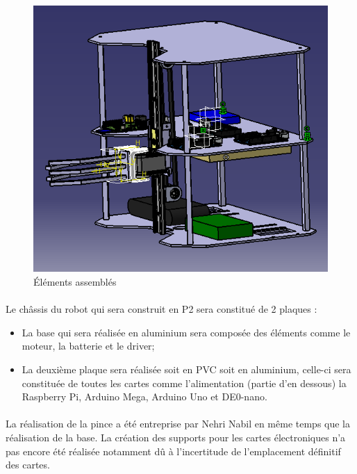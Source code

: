 \vspace{5mm}
\begin{figure}[!ht]
	\centering
		\includegraphics{assemblage.png}
	\caption{Éléments assemblés}
	\label{fig:assemblage}
\end{figure}

\paragraph{}
Le châssis du robot qui sera construit en P2 sera constitué de 2 plaques :
\begin{itemize}
	\item La base qui sera réalisée en aluminium sera composée des éléments comme le moteur, la batterie et le driver; 
	\item La deuxième plaque sera réalisée soit en PVC soit en aluminium, celle-ci sera constituée de toutes les cartes comme l'alimentation (partie d'en dessous) la Raspberry Pi, Arduino Mega, Arduino Uno et DE0-nano.
\end{itemize}

\paragraph{}
La réalisation de la pince a été entreprise par Nehri Nabil en même temps que la réalisation de la base. La création des supports pour les cartes électroniques n'a pas encore été réalisée notamment dû à l'incertitude de l'emplacement définitif des cartes. 

